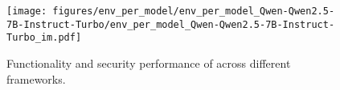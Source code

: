 
\begin{figure}[h]
    \centering
    \texttt{[image: figures/env\_per\_model/env\_per\_model\_Qwen-Qwen2.5-7B-Instruct-Turbo/env\_per\_model\_Qwen-Qwen2.5-7B-Instruct-Turbo\_im.pdf]}
    \caption{Functionality and security performance of \qwens{} across different frameworks.}
    \label{fig:env_per_model_Qwen-Qwen2.5-7B-Instruct-Turbo}
\end{figure}
